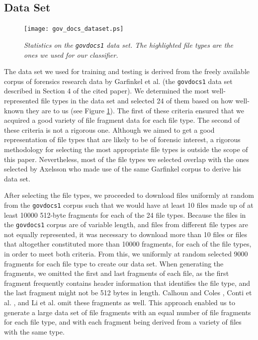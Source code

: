 \documentclass[5p]{elsarticle}
\begin{document}
\subsection{Data Set}
\label{Subsection:DataSet}

\begin{figure}[t!]
\centering
\texttt{[image: gov\_docs\_dataset.ps]}
\caption{\textit{Statistics on the \texttt{govdocs1} data set. The highlighted file types are the ones we used for our classifier.}\label{fig:govdocs1DataSet}}
\end{figure}

The data set we used for training and testing is derived from the freely available corpus of forensics research data by Garfinkel et al. \cite{Garfinkel09} (the \texttt{govdocs1} data set described in Section 4 of the cited paper). We determined the most well-represented file types in the data set and selected 24 of them based on how well-known they are to us (see Figure \ref{fig:govdocs1DataSet}). The first of these criteria ensured that we acquired a good variety of file fragment data for each file type. The second of these criteria is not a rigorous one. Although we aimed to get a good representation of file types that are likely to be of forensic interest, a rigorous methodology for selecting the most appropriate file types is outside the scope of this paper. Nevertheless, most of the file types we selected overlap with the ones selected by Axelsson \cite{Axelsson10} who made use of the same Garfinkel corpus to derive his data set.

After selecting the file types, we proceeded to download files uniformly at random from the \texttt{govdocs1} corpus such that we would have at least 10 files made up of at least 10000 512-byte fragments for each of the 24 file types. Because the files in the \texttt{govdocs1} corpus are of variable length, and files from different file types are not equally represented, it was necessary to download more than 10 files or files that altogether constituted more than 10000 fragments, for each of the file types, in order to meet both criteria. From this, we uniformly at random selected 9000 fragments for each file type to create our data set. When generating the fragments, we omitted the first and last fragments of each file, as the first fragment frequently contains header information that identifies the file type, and the last fragment might not be 512 bytes in length. Calhoun and Coles \cite{Calhoun08}, Conti et al. \cite{Conti10}, and Li et al. \cite{Li10} omit these fragments as well. This approach enabled us to generate a large data set of file fragments with an equal number of file fragments for each file type, and with each fragment being derived from a variety of files with the same type.
\end{document}

